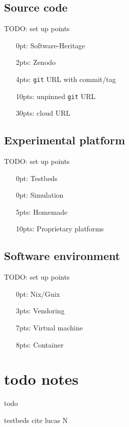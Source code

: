 \documentclass[sigconf]{acmart}
\newcommand{\todo}[1]{{\color{red}TODO: #1}}
\begin{document}
\subsection{Source code}

\todo{set up points}

\begin{itemize}
  \item[0pt:] Software-Heritage
  \item[2pts:] Zenodo
  \item[4pts:] \texttt{git} URL with commit/tag
  \item[10pts:] unpinned \texttt{git} URL
  \item[30pts:] cloud URL
\end{itemize}


\subsection{Experimental platform}

\todo{set up points}

\begin{itemize}
  \item[0pt:] Testbeds
  \item[0pt:] Simulation
  \item[5pts:] Homemade
  \item[10pts:] Proprietary platforms
\end{itemize}

\subsection{Software environment}

\todo{set up points}

\begin{itemize}
  \item[0pt:] Nix/Guix
  \item[3pts:] Vendoring
  \item[7pts:] Virtual machine
  \item[8pts:] Container
\end{itemize}



\section{todo notes}

todo

testbeds cite lucas N
\end{document}
